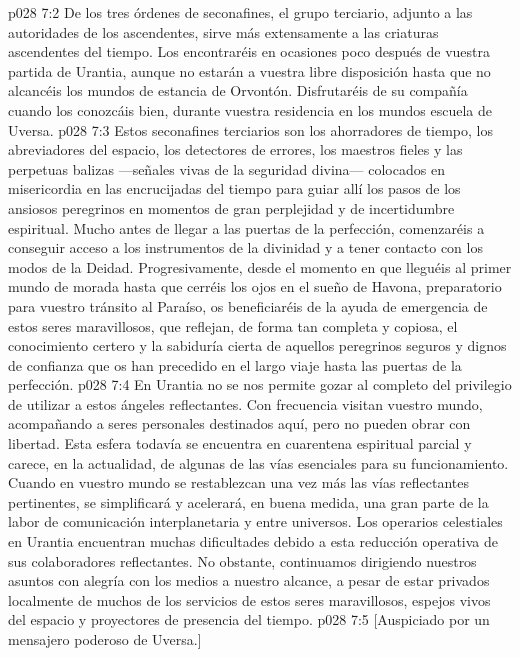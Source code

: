 \vs p028 7:2 \pc De los tres órdenes de seconafines, el grupo terciario, adjunto a las autoridades de los ascendentes, sirve más extensamente a las criaturas ascendentes del tiempo. Los encontraréis en ocasiones poco después de vuestra partida de Urantia, aunque no estarán a vuestra libre disposición hasta que no alcancéis los mundos de estancia de Orvontón. Disfrutaréis de su compañía cuando los conozcáis bien, durante vuestra residencia en los mundos escuela de Uversa.
\vs p028 7:3 Estos seconafines terciarios son los ahorradores de tiempo, los abreviadores del espacio, los detectores de errores, los maestros fieles y las perpetuas balizas ---señales vivas de la seguridad divina--- colocados en misericordia en las encrucijadas del tiempo para guiar allí los pasos de los ansiosos peregrinos en momentos de gran perplejidad y de incertidumbre espiritual. Mucho antes de llegar a las puertas de la perfección, comenzaréis a conseguir acceso a los instrumentos de la divinidad y a tener contacto con los modos de la Deidad. Progresivamente, desde el momento en que lleguéis al primer mundo de morada hasta que cerréis los ojos en el sueño de Havona, preparatorio para vuestro tránsito al Paraíso, os beneficiaréis de la ayuda de emergencia de estos seres maravillosos, que reflejan, de forma tan completa y copiosa, el conocimiento certero y la sabiduría cierta de aquellos peregrinos seguros y dignos de confianza que os han precedido en el largo viaje hasta las puertas de la perfección.
\vs p028 7:4 En Urantia no se nos permite gozar al completo del privilegio de utilizar a estos ángeles reflectantes. Con frecuencia visitan vuestro mundo, acompañando a seres personales destinados aquí, pero no pueden obrar con libertad. Esta esfera todavía se encuentra en cuarentena espiritual parcial y carece, en la actualidad, de algunas de las vías esenciales para su funcionamiento. Cuando en vuestro mundo se restablezcan una vez más las vías reflectantes pertinentes, se simplificará y acelerará, en buena medida, una gran parte de la labor de comunicación interplanetaria y entre universos. Los operarios celestiales en Urantia encuentran muchas dificultades debido a esta reducción operativa de sus colaboradores reflectantes. No obstante, continuamos dirigiendo nuestros asuntos con alegría con los medios a nuestro alcance, a pesar de estar privados localmente de muchos de los servicios de estos seres maravillosos, espejos vivos del espacio y proyectores de presencia del tiempo.
\vsetoff
\vs p028 7:5 [Auspiciado por un mensajero poderoso de Uversa.]
